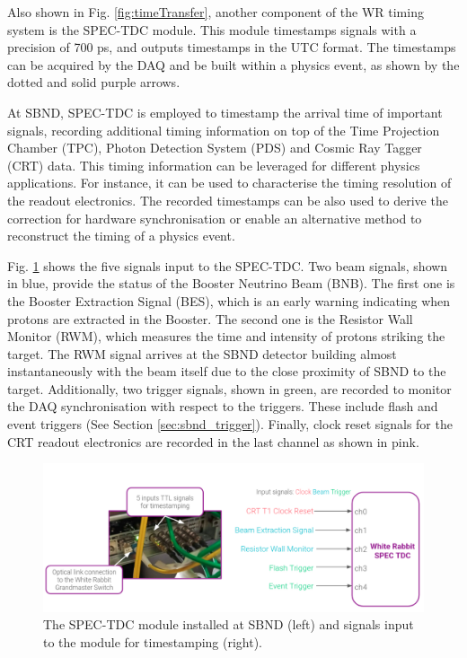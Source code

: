 Also shown in Fig. \ref{fig:timeTransfer}, another component of the WR timing system is the SPEC-TDC module.
This module timestamps signals with a precision of 700 ps, and outputs timestamps in the UTC format.
The timestamps can be acquired by the DAQ and be built within a physics event, as shown by the dotted and solid purple arrows. 

At SBND, SPEC-TDC is employed to timestamp the arrival time of important signals, recording additional timing information on top of the Time Projection Chamber (TPC), Photon Detection System (PDS) and Cosmic Ray Tagger (CRT) data.
This timing information can be leveraged for different physics applications.
For instance, it can be used to characterise the timing resolution of the readout electronics.
The recorded timestamps can be also used to derive the correction for hardware synchronisation or enable an alternative method to reconstruct the timing of a physics event. 

Fig. \ref{fig:SPECTDC} shows the five signals input to the SPEC-TDC. 
Two beam signals, shown in blue, provide the status of the Booster Neutrino Beam (BNB).
The first one is the Booster Extraction Signal (BES), which is an early warning indicating when protons are extracted in the Booster.
The second one is the Resistor Wall Monitor (RWM), which measures the time and intensity of protons striking the target.
The RWM signal arrives at the SBND detector building almost instantaneously with the beam itself due to the close proximity of SBND to the target.
Additionally, two trigger signals, shown in green, are recorded to monitor the DAQ synchronisation with respect to the triggers. 
These include flash and event triggers (See Section \ref{sec:sbnd_trigger}).
Finally, clock reset signals for the CRT readout electronics are recorded in the last channel as shown in pink. 

\begin{figure}[hb!] 
\centering    
\includegraphics[width=1.0\textwidth]{SPEC_TDC}
\caption[SPEC-TDC Module and Its Input Signals]{
The SPEC-TDC module installed at SBND (left) and signals input to the module for timestamping (right).
}
\label{fig:SPECTDC}
\end{figure}

